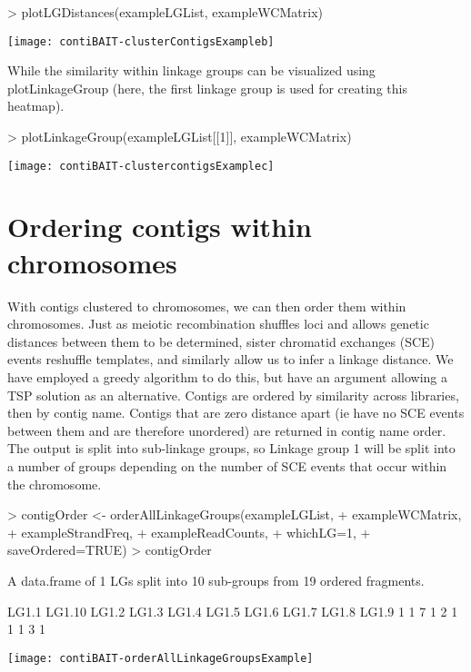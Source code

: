 \documentclass{article}
\begin{document}
\begin{Schunk}
\begin{Sinput}
> plotLGDistances(exampleLGList, exampleWCMatrix)
\end{Sinput}
\end{Schunk}
\texttt{[image: contiBAIT-clusterContigsExampleb]}


While the similarity within linkage groups can be visualized using plotLinkageGroup (here, the first linkage group is used for creating this heatmap).

\begin{Schunk}
\begin{Sinput}
> plotLinkageGroup(exampleLGList[[1]], exampleWCMatrix)
\end{Sinput}
\end{Schunk}
\texttt{[image: contiBAIT-clustercontigsExamplec]}


\section{Ordering contigs within chromosomes}

With contigs clustered to chromosomes, we can then order them within chromosomes. Just as meiotic recombination shuffles loci and allows genetic distances between them to be determined, sister chromatid exchanges (SCE) events reshuffle templates, and similarly allow us to infer a linkage distance. We have employed a greedy algorithm to do this, but have an argument allowing a TSP solution as an alternative. Contigs are ordered by similarity across libraries, then by contig name. Contigs that are zero distance apart (ie have no SCE events between them and are therefore unordered) are returned in contig name order. The output is split into sub-linkage groups, so Linkage group 1 will be split into a number of groups depending on the number of SCE events that occur within the chromosome.

\begin{Schunk}
\begin{Sinput}
> contigOrder <- orderAllLinkageGroups(exampleLGList,
+ exampleWCMatrix,
+ exampleStrandFreq,
+ exampleReadCounts,
+ whichLG=1,
+ saveOrdered=TRUE)
> contigOrder
\end{Sinput}
\begin{Soutput}
A data.frame of 1 LGs split into 10 sub-groups from 19 ordered fragments.

 LG1.1 LG1.10  LG1.2  LG1.3  LG1.4  LG1.5  LG1.6  LG1.7  LG1.8  LG1.9 
     1      1      7      1      2      1      1      1      3      1 
\end{Soutput}
\end{Schunk}
\texttt{[image: contiBAIT-orderAllLinkageGroupsExample]}
\end{document}
